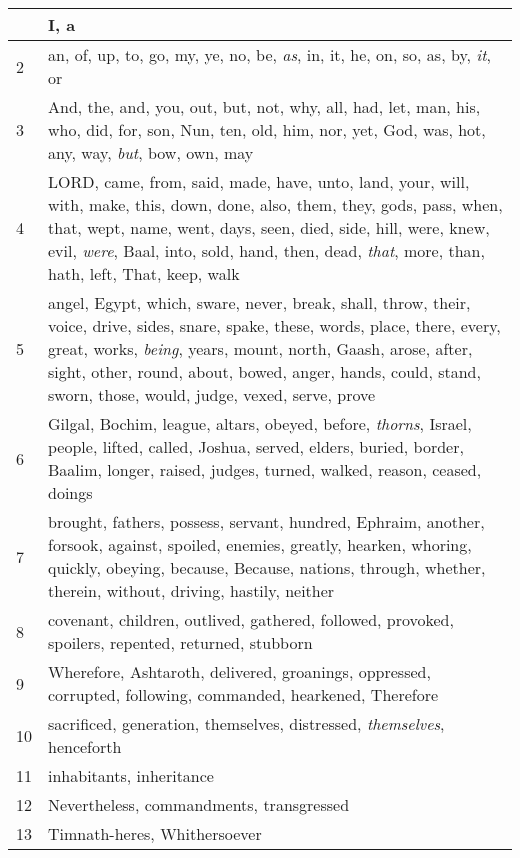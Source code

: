 \begin{longtable}{l|p{3.75in}}
\hline \hline
\endlastfoot
1 & I, a \\ \hline
2 & an, of, up, to, go, my, ye, no, be, \emph{as}, in, it, he, on, so, as, by, \emph{it}, or \\ \hline
3 & And, the, and, you, out, but, not, why, all, had, let, man, his, who, did, for, son, Nun, ten, old, him, nor, yet, God, was, hot, any, way, \emph{but}, bow, own, may \\ \hline
4 & LORD, came, from, said, made, have, unto, land, your, will, with, make, this, down, done, also, them, they, gods, pass, when, that, wept, name, went, days, seen, died, side, hill, were, knew, evil, \emph{were}, Baal, into, sold, hand, then, dead, \emph{that}, more, than, hath, left, That, keep, walk \\ \hline
5 & angel, Egypt, which, sware, never, break, shall, throw, their, voice, drive, sides, snare, spake, these, words, place, there, every, great, works, \emph{being}, years, mount, north, Gaash, arose, after, sight, other, round, about, bowed, anger, hands, could, stand, sworn, those, would, judge, vexed, serve, prove \\ \hline
6 & Gilgal, Bochim, league, altars, obeyed, before, \emph{thorns}, Israel, people, lifted, called, Joshua, served, elders, buried, border, Baalim, longer, raised, judges, turned, walked, reason, ceased, doings \\ \hline
7 & brought, fathers, possess, servant, hundred, Ephraim, another, forsook, against, spoiled, enemies, greatly, hearken, whoring, quickly, obeying, because, Because, nations, through, whether, therein, without, driving, hastily, neither \\ \hline
8 & covenant, children, outlived, gathered, followed, provoked, spoilers, repented, returned, stubborn \\ \hline
9 & Wherefore, Ashtaroth, delivered, groanings, oppressed, corrupted, following, commanded, hearkened, Therefore \\ \hline
10 & sacrificed, generation, themselves, distressed, \emph{themselves}, henceforth \\ \hline
11 & inhabitants, inheritance \\ \hline
12 & Nevertheless, commandments, transgressed \\ \hline
13 & Timnath-heres, Whithersoever \\ \hline
\end{longtable}






